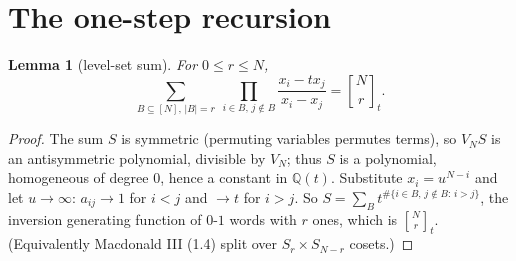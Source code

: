 \documentclass[11pt]{article}
\newtheorem{lemma}{Lemma}[section]
\theoremstyle{definition}
\newcommand{\Q}{\mathbb{Q}}
\newcommand{\gbin}[3]{\genfrac{[}{]}{0pt}{}{#1}{#2}_{#3}}
\begin{document}
\section{The one-step recursion}

\begin{lemma}[level-set sum]\label{lem:level}
For $0\le r\le N$,
\[\sum_{B\subseteq[N],\,|B|=r}\ \prod_{i\in B,\,j\notin B}\frac{x_i-tx_j}{x_i-x_j}=\gbin{N}{r}{t}.\]
\end{lemma}
\begin{proof}
The sum $S$ is symmetric (permuting variables permutes terms), so $V_N S$ is an antisymmetric polynomial, divisible by $V_N$; thus $S$ is a polynomial, homogeneous of degree $0$, hence a constant in $\Q(t)$. Substitute $x_i=u^{N-i}$ and let $u\to\infty$: $a_{ij}\to1$ for $i<j$ and $\to t$ for $i>j$. So $S=\sum_Bt^{\#\{i\in B,\,j\notin B:\,i>j\}}$, the inversion generating function of $0$-$1$ words with $r$ ones, which is $\gbin Nr t$. (Equivalently Macdonald III (1.4) split over $S_r\times S_{N-r}$ cosets.)
\end{proof}
\end{document}
